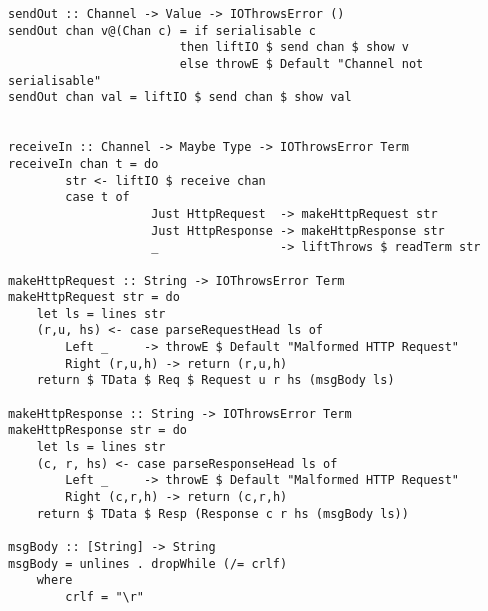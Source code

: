 \begin{verbatim}
sendOut :: Channel -> Value -> IOThrowsError () 
sendOut chan v@(Chan c) = if serialisable c
                        then liftIO $ send chan $ show v
                        else throwE $ Default "Channel not serialisable" 
sendOut chan val = liftIO $ send chan $ show val


receiveIn :: Channel -> Maybe Type -> IOThrowsError Term
receiveIn chan t = do
        str <- liftIO $ receive chan
        case t of
                    Just HttpRequest  -> makeHttpRequest str
                    Just HttpResponse -> makeHttpResponse str
                    _                 -> liftThrows $ readTerm str

makeHttpRequest :: String -> IOThrowsError Term
makeHttpRequest str = do
    let ls = lines str
    (r,u, hs) <- case parseRequestHead ls of
        Left _     -> throwE $ Default "Malformed HTTP Request"
        Right (r,u,h) -> return (r,u,h)
    return $ TData $ Req $ Request u r hs (msgBody ls)

makeHttpResponse :: String -> IOThrowsError Term
makeHttpResponse str = do
    let ls = lines str
    (c, r, hs) <- case parseResponseHead ls of
        Left _     -> throwE $ Default "Malformed HTTP Request"
        Right (c,r,h) -> return (c,r,h)
    return $ TData $ Resp (Response c r hs (msgBody ls))

msgBody :: [String] -> String
msgBody = unlines . dropWhile (/= crlf)
    where
        crlf = "\r"
\end{verbatim}


